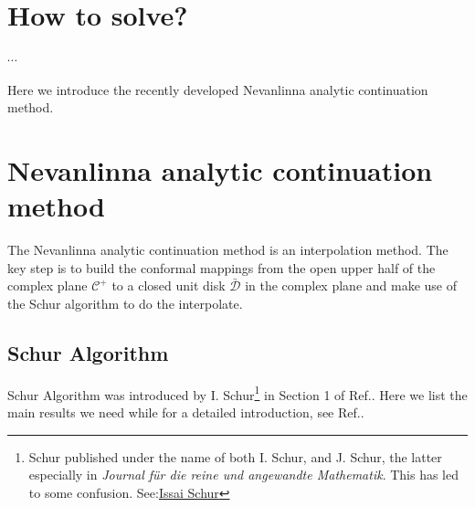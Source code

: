 \documentclass[
	preprint,%
	aps,
	prb,
	showpacs,	
	amsmath, amssymb]{revtex4-2}
\newcommand{\C}{ {\mathcal{C}} }
\newcommand{\Dbar}{ {\bar{\mathcal{D}}} }
\begin{document}
\section{How to solve?}
\label{sec:how-to-solve}

$\cdots$

Here we introduce the recently developed Nevanlinna 
analytic continuation method\cite{fei2021nevanlinna}.      
\section{Nevanlinna analytic continuation method}
\label{sec:nevanlinna-analytical-continuation-method}

The Nevanlinna analytic continuation method\cite{fei2021nevanlinna} 
is an interpolation method. The key step is to build the conformal mappings 
from the open upper half of the complex plane $\C^+$ 
to a closed unit disk $\Dbar$ in the complex plane and 
make use of the Schur algorithm
\cite{schur1917potenzreihen,schur1918potenzreihen,dym2003contributions} 
to do the interpolate.

\subsection{Schur Algorithm}
\label{subsec:schur-algorithm}

Schur Algorithm was introduced by I. Schur\footnote{Schur 
	published under the name of both I. Schur, 
	and J. Schur, the latter especially in  
	\textit{Journal für die reine 
	und angewandte Mathematik}. This has led to some confusion.
	See:\href{https://en.wikipedia.org/wiki/Issai_Schur#cite_note-2}{Issai Schur}} 
in Section 1 of Ref.\cite{schur1917potenzreihen}.
Here we list the main results we need while
for a detailed introduction, see Ref.\cite{dym2003contributions}. 
\end{document}
